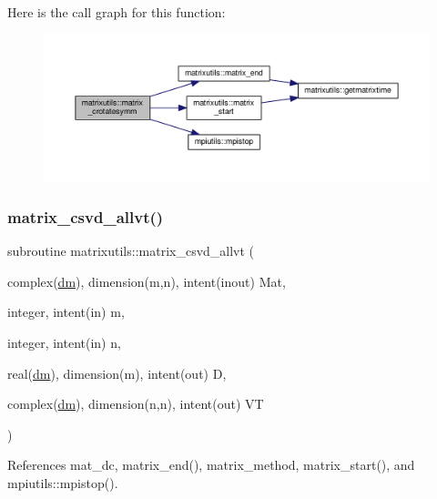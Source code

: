 Here is the call graph for this function\+:
\nopagebreak
\begin{figure}[H]
\begin{center}
\leavevmode
\includegraphics[width=350pt]{namespacematrixutils_a289ea264af6294e91e4906d329ab1bca_cgraph}
\end{center}
\end{figure}
\mbox{\label{namespacematrixutils_aaca4350f2cff361fd0233962eba5fdc7}} 
\subsubsection{\texorpdfstring{matrix\+\_\+csvd\+\_\+allvt()}{matrix\_csvd\_allvt()}}
{\footnotesize\ttfamily subroutine matrixutils\+::matrix\+\_\+csvd\+\_\+allvt (\begin{DoxyParamCaption}\item[{complex(\mbox{\hyperlink{namespacematrixutils_a7bdc564986ea4d90f51201c75606ef3d}{dm}}), dimension(m,n), intent(inout)}]{Mat,  }\item[{integer, intent(in)}]{m,  }\item[{integer, intent(in)}]{n,  }\item[{real(\mbox{\hyperlink{namespacematrixutils_a7bdc564986ea4d90f51201c75606ef3d}{dm}}), dimension(m), intent(out)}]{D,  }\item[{complex(\mbox{\hyperlink{namespacematrixutils_a7bdc564986ea4d90f51201c75606ef3d}{dm}}), dimension(n,n), intent(out)}]{VT }\end{DoxyParamCaption})}



References mat\+\_\+dc, matrix\+\_\+end(), matrix\+\_\+method, matrix\+\_\+start(), and mpiutils\+::mpistop().

